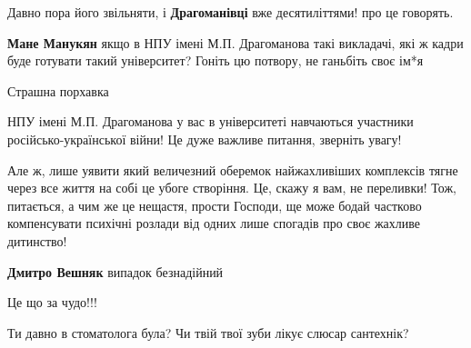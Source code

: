 \begin{itemize}
Давно пора його звільняти, і \textbf{Драгоманівці} вже десятиліттями! про це говорять.

\begin{itemize}

\textbf{Мане Манукян} якщо в НПУ імені М.П. Драгоманова такі викладачі, які ж кадри буде готувати такий університет? Гоніть цю потвору, не ганьбіть своє ім*я
\end{itemize}


Страшна порхавка




НПУ імені М.П. Драгоманова у вас в університеті навчаються участники
російсько-української війни! Це дуже важливе питання, зверніть увагу!




Але ж, лише уявити який величезний оберемок найжахливіших комплексів тягне
через все життя на собі це убоге створіння. Це, скажу я вам, не переливки! Тож,
питається, а чим же це нещастя, прости Господи, ще може бодай частково
компенсувати психічні розлади від одних лише спогадів про своє жахливе
дитинство!

\begin{itemize}

\textbf{Дмитро Вешняк} випадок безнадійний
\end{itemize}


Це що за чудо!!!


Ти давно в стоматолога була?
Чи твій твої зуби лікує слюсар сантехнік?



\end{itemize}
